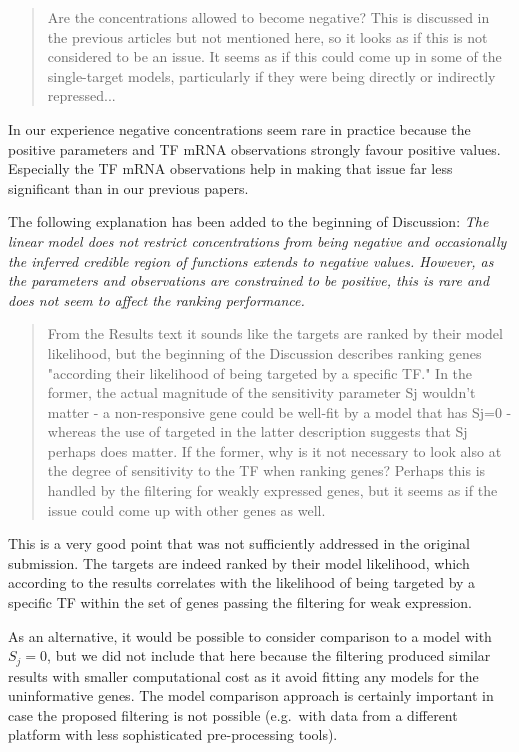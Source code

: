 \documentclass{article}
\begin{document}
\begin{quote} Are the concentrations allowed to become negative?
    This is discussed in the previous articles but not mentioned here,
    so it looks as if this is not considered to be an issue. It seems
    as if this could come up in some of the single-target models,
    particularly if they were being directly or indirectly
    repressed...
\end{quote}

In our experience negative concentrations seem rare in practice
because the positive parameters and TF mRNA observations strongly
favour positive values.  Especially the TF mRNA observations help in
making that issue far less significant than in our previous papers.

The following explanation has been added to the beginning of Discussion:
\emph{The linear model does not restrict concentrations from being negative
and occasionally the inferred credible region of functions extends to negative
values. However, as the parameters and observations are constrained to be positive,
this is rare and does not seem to affect the ranking performance.}

\begin{quote} From the Results text it sounds like the targets
    are ranked by their model likelihood, but the beginning of the
    Discussion describes ranking genes "according their likelihood of
    being targeted by a specific TF." In the former, the actual
    magnitude of the sensitivity parameter Sj wouldn't matter - a
    non-responsive gene could be well-fit by a model that has Sj=0 -
    whereas the use of targeted in the latter description suggests
    that Sj perhaps does matter. If the former, why is it not
    necessary to look also at the degree of sensitivity to the TF when
    ranking genes? Perhaps this is handled by the filtering for weakly
    expressed genes, but it seems as if the issue could come up with
    other genes as well.
\end{quote}

This is a very good point that was not sufficiently addressed in the
original submission.  The targets are indeed ranked by their model
likelihood, which according to the results correlates with the
likelihood of being targeted by a specific TF within the set of
genes passing the filtering for weak expression.

As an alternative, it would be possible to consider comparison to a
model with $S_j = 0$, but we did not include that here because the
filtering produced similar results with smaller computational cost as
it avoid fitting any models for the uninformative genes.  The model
comparison approach is certainly important in case the proposed
filtering is not possible (e.g.\ with data from a different platform
with less sophisticated pre-processing tools).
\end{document}
